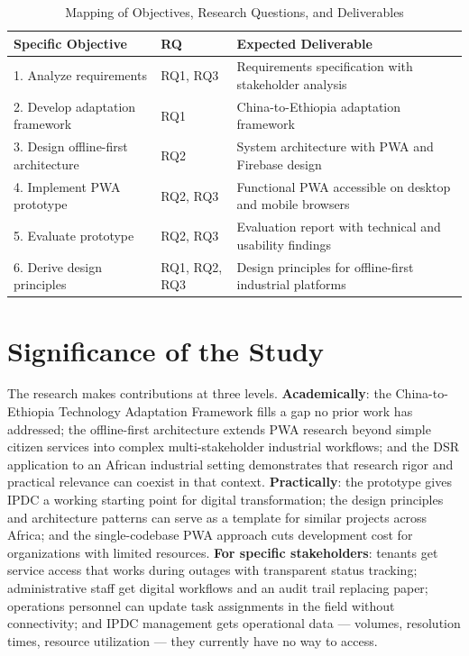 \begin{table}[H]
\centering
\caption{Mapping of Objectives, Research Questions, and Deliverables}
\label{tab:obj-rq-mapping}
\begin{tabular}{p{3.5cm}p{2cm}p{6cm}}
\toprule
\textbf{Specific Objective} & \textbf{RQ} & \textbf{Expected Deliverable} \\
\midrule
1. Analyze requirements & RQ1, RQ3 & Requirements specification with stakeholder analysis \\
2. Develop adaptation framework & RQ1 & China-to-Ethiopia adaptation framework \\
3. Design offline-first architecture & RQ2 & System architecture with PWA and Firebase design \\
4. Implement PWA prototype & RQ2, RQ3 & Functional PWA accessible on desktop and mobile browsers \\
5. Evaluate prototype & RQ2, RQ3 & Evaluation report with technical and usability findings \\
6. Derive design principles & RQ1, RQ2, RQ3 & Design principles for offline-first industrial platforms \\
\bottomrule
\end{tabular}
\end{table}

\section{Significance of the Study}

The research makes contributions at three levels. \textbf{Academically}: the China-to-Ethiopia Technology Adaptation Framework fills a gap no prior work has addressed; the offline-first architecture extends PWA research beyond simple citizen services into complex multi-stakeholder industrial workflows; and the DSR application to an African industrial setting demonstrates that research rigor and practical relevance can coexist in that context. \textbf{Practically}: the prototype gives IPDC a working starting point for digital transformation; the design principles and architecture patterns can serve as a template for similar projects across Africa; and the single-codebase PWA approach cuts development cost for organizations with limited resources. \textbf{For specific stakeholders}: tenants get service access that works during outages with transparent status tracking; administrative staff get digital workflows and an audit trail replacing paper; operations personnel can update task assignments in the field without connectivity; and IPDC management gets operational data --- volumes, resolution times, resource utilization --- they currently have no way to access.

